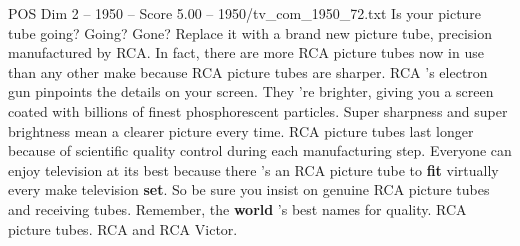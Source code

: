 \begin{textsample}{POS Dim 2 – 1950 – Score 5.00 – 1950/tv\_com\_1950\_72.txt}  \label{ex:f2_pos_005}
Is your picture tube going?
Going?
Gone?
Replace it with a brand new picture tube, precision manufactured by RCA.
In fact, there are more RCA picture tubes now in use than any other make because RCA picture tubes are sharper.
RCA 's electron gun pinpoints the details on your screen.
They 're brighter, giving you a screen coated with billions of finest phosphorescent particles.
Super sharpness and super brightness mean a clearer picture every time.
RCA picture tubes last longer because of scientific quality control during each manufacturing step.
Everyone can enjoy television at its best because there 's an RCA picture tube to \textbf{fit} virtually every make television \textbf{set}.
So be sure you insist on genuine RCA picture tubes and receiving tubes.
Remember, the \textbf{world} 's best names for quality.
RCA picture tubes.
RCA and RCA Victor.

\end{textsample}
